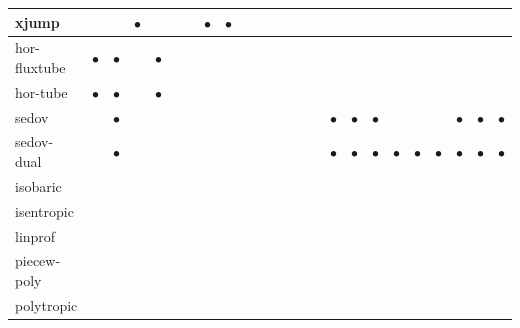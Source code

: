 \documentclass[\mydriver,12pt,twoside,notitlepage,a4paper]{article}
\newcommand{\req}{$\bullet$}
\begin{document}
\begin{longtable}{l|c|c|c|c|c|c|c|c|c|c|c|c|c|c|c|c|c|c|c|c|c|c|c}
  xjump             & {}   & {}   & \req & {}   & {}   & {}   & \req 
                    & \req & {}   & {}   & {}   & {}   & {}   & {}
                    & {}   & {}   & {}   & {}   & {}   & {}   & {}
                    & {}   & {}   \\
\midrule
  hor-fluxtube      & \req & \req & {}   & \req & {}   & {}   & {}   
                    & {}   & {}   & {}   & {}   & {}   & {}   & {}
                    & {}   & {}   & {}   & {}   & {}   & {}   & {}
                    & {}   & {}   \\
\midrule
  hor-tube          & \req & \req & {}   & \req & {}   & {}   & {}   
                    & {}   & {}   & {}   & {}   & {}   & {}   & {}
                    & {}   & {}   & {}   & {}   & {}   & {}   & {}
                    & {}   & {}   \\
\midrule
  sedov             & {}   & \req & {}   & {}   & {}   & {}   & {}   
                    & {}   & {}   & {}   & {}   & {}   & {}   & {}
                    & \req & \req & \req & {}   & {}   & {}   & \req
                    & \req & \req \\
\midrule
  sedov-dual        & {}   & \req & {}   & {}   & {}   & {}   & {}   
                    & {}   & {}   & {}   & {}   & {}   & {}   & {}
                    & \req & \req & \req & \req & \req & \req & \req
                    & \req & \req \\
\midrule
  isobaric          & {}   & {}   & {}   & {}   & {}   & {}   & {}   
                    & {}   & {}   & {}   & {}   & {}   & {}   & {}
                    & {}   & {}   & {}   & {}   & {}   & {}   & {}
                    & {}   & {}   \\
\midrule
  isentropic        & {}   & {}   & {}   & {}   & {}   & {}   & {}   
                    & {}   & {}   & {}   & {}   & {}   & {}   & {}
                    & {}   & {}   & {}   & {}   & {}   & {}   & {}
                    & {}   & {}   \\
\midrule
  linprof           & {}   & {}   & {}   & {}   & {}   & {}   & {}   
                    & {}   & {}   & {}   & {}   & {}   & {}   & {}
                    & {}   & {}   & {}   & {}   & {}   & {}   & {}
                    & {}   & {}   \\
\midrule
  piecew-poly       & {}   & {}   & {}   & {}   & {}   & {}   & {}   
                    & {}   & {}   & {}   & {}   & {}   & {}   & {}
                    & {}   & {}   & {}   & {}   & {}   & {}   & {}
                    & {}   & {}   \\
\midrule
  polytropic        & {}   & {}   & {}   & {}   & {}   & {}   & {}   
                    & {}   & {}   & {}   & {}   & {}   & {}   & {}
                    & {}   & {}   & {}   & {}   & {}   & {}   & {}
                    & {}   & {}   \\
%
\bottomrule
\end{longtable}
\end{document}
